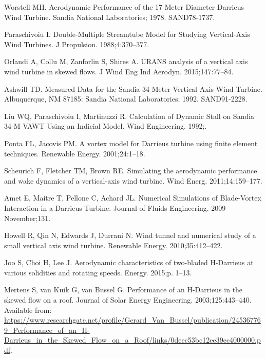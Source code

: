 \documentclass[10pt,letterpaper]{article}
\begin{document}
\begin{thebibliography}{10}
    Worstell MH.
    \newblock Aerodynamic Performance of the 17 Meter Diameter {Darrieus} Wind
    Turbine.
    \newblock Sandia National Laboratories; 1978. SAND78-1737.

    Paraschivoiu I.
    \newblock Double-Multiple Streamtube Model for Studying Vertical-Axis Wind
    Turbines.
    \newblock J Propulsion. 1988;4:370--377.

    Orlandi A, Collu M, Zanforlin S, Shires A.
     {URANS} analysis of a vertical axis wind turbine in skewed
    flows.
    \newblock J Wind Eng Ind Aerodyn. 2015;147:77--84.

    Ashwill TD.
    \newblock Measured Data for the {S}andia 34-Meter Vertical Axis Wind Turbine.
    \newblock Albuquerque, NM 87185: Sandia National Laboratories; 1992.
    SAND91-2228.

    Liu WQ, Paraschivoiu I, Martinuzzi R.
    \newblock Calculation of Dynamic Stall on {S}andia 34-M {VAWT} Using an
    Indicial Model.
    \newblock Wind Engineering. 1992;.

    Ponta FL, Jacovis PM.
    \newblock A vortex model for Darrieus turbine using finite element techniques.
    \newblock Renewable Energy. 2001;24:1--18.

    Scheurich F, Fletcher TM, Brown RE.
    \newblock Simulating the aerodynamic performance and wake dynamics of a
    vertical-axis wind turbine.
    \newblock Wind Energ. 2011;14:159--177.

    Amet E, Maitre T, Pellone C, Achard JL.
     Numerical Simulations of Blade-Vortex Interaction in a
    {D}arrieus Turbine.
    \newblock Journal of Fluids Engineering. 2009 November;131.

    Howell R, Qin N, Edwards J, Durrani N.
    \newblock Wind tunnel and numerical study of a small vertical axis wind
    turbine.
    \newblock Renewable Energy. 2010;35:412--422.

    Joo S, Choi H, Lee J.
    \newblock Aerodynamic characteristics of two-bladed H-Darrieus at various
    solidities and rotating speeds.
    \newblock Energy. 2015;p. 1--13.

    Mertens S, van Kuik G, van Bussel G.
    \newblock Performance of an {H}-{D}arrieus in the skewed flow on a roof.
    \newblock Journal of Solar Energy Engineering. 2003;125:443--440.
    \newblock Available from:
    \url{https://www.researchgate.net/profile/Gerard_Van_Bussel/publication/245367769_Performance_of_an_H-Darrieus_in_the_Skewed_Flow_on_a_Roof/links/0deec53bc12ee39ec4000000.pdf}.


\end{thebibliography}
\end{document}
